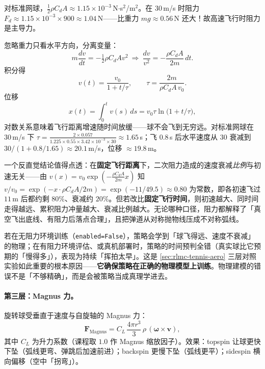 对标准网球，$\tfrac12\rho C_d A\approx1.15\times10^{-3}$\,N$\cdot$s$^2$/m$^2$。在 $30$\,m/s 时阻力 $F_d\approx1.15\times10^{-3}\times900\approx1.04$\,N——比重力 $mg\approx0.56$\,N 还大！故高速飞行时阻力是主导力。

\begin{derivation}[一维匀速阻力下的速度衰减解析解]
忽略重力只看水平方向，分离变量：
\[
m\frac{dv}{dt}=-\tfrac12\rho C_d A v^2\ \Rightarrow\ \frac{dv}{v^2}=-\frac{\rho C_d A}{2m}\,dt.
\]
积分得
\begin{equation}
v(t)=\frac{v_0}{1+t/\tau},\qquad \tau=\frac{2m}{\rho C_d A\, v_0}.
\label{eq:rlmc-tennis-vtau}
\end{equation}
位移
\[
x(t)=\int_0^t v(s)\,ds=v_0\tau\ln\!\big(1+t/\tau\big),
\]
对数关系意味着飞行距离增速随时间放缓——球不会飞到无穷远。对标准网球在 $30$\,m/s 下 $\tau=\frac{2\times0.057}{1.225\times0.55\times3.42\times10^{-3}\times30}\approx1.65$\,s；飞 $0.8$\,s 后水平速度从 $30$ 衰减到 $30/(1+0.8/1.65)\approx20.1$\,m/s，位移 $\approx19.8$\,m。
\end{derivation}

一个反直觉结论值得点透：在\textbf{固定飞行距离}下，二次阻力造成的速度衰减\emph{比例}与初速无关——由 $v(x)=v_0\exp(-\tfrac{\rho C_d A}{2m}x)$ 知 $v/v_0=\exp(-x\cdot\rho C_d A/2m)=\exp(-11/49.5)\approx0.80$ 为常数，即各初速飞过 $11$\,m 后都约剩 $80\%$、衰减约 $20\%$。但若改比\textbf{固定飞行时间}，则初速越大、同时间走得越远、累积阻力冲量越大、衰减比例越大。无论哪种口径，阻力都解释了「真空飞出底线、有阻力后落点合理」，且把弹道从对称抛物线压成不对称弧线。

\begin{insight}\label{ins:rlmc-tennis-aero}
若在无阻力环境训练（\verb|enabled=False|），策略会学到「球飞得远、速度不衰减」的物理；在有阻力环境评估、或真机部署时，策略的时间预判全错（真实球比它预期的「慢得多」），表现为持续「挥拍太早」。这是 \cref{sec:rlmc-tennis-aero} 三层对照实验如此重要的根本原因——\textbf{它确保策略在正确的物理模型上训练}。物理建模的错误不是「不够精确」，而是会被策略当成真理学进去。
\end{insight}

\paragraph{第三层：Magnus 力。}旋转球受垂直于速度与自旋轴的 Magnus 力：
\begin{equation}
\mathbf{F}_{\text{Magnus}}=C_L\,\frac{4\pi r^3}{3}\,\rho\,(\boldsymbol\omega\times\mathbf v),
\label{eq:rlmc-tennis-magnus}
\end{equation}
其中 $C_L$ 为升力系数（课程取 $1.0$ 作 Magnus 缩放因子）。效果：topspin 让球更快下坠（弧线更弯、弹跳后加速前进）；backspin 更慢下坠（弧线更平）；sidespin 横向偏移（空中「拐弯」）。

